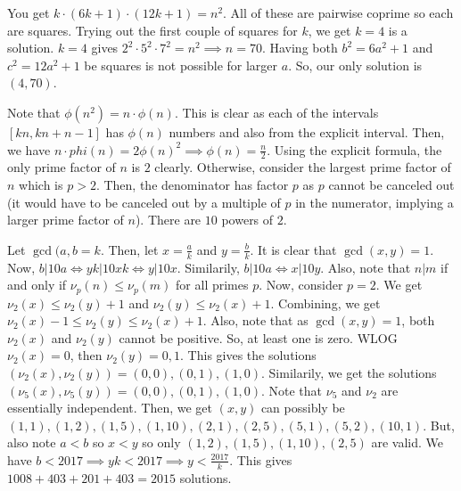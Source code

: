 \documentclass[11pt]{article}
\begin{document}
\begin{sol}
You get $k\cdot (6k+1)\cdot (12k+1)=n^2$. All of these are pairwise coprime so each are squares. Trying out the first couple of squares for $k$, we get $k=4$ is a solution. $k=4$ gives $2^2\cdot 5^2\cdot 7^2=n^2\implies n = 70$. Having both $b^2=6a^2+1$ and $c^2=12a^2+1$ be squares is not possible for larger $a$. So, our only solution is $\boxed{(4,70)}$.
\end{sol}
 

\begin{sol}
Note that $\phi(n^2)=n\cdot \phi(n)$. This is clear as each of the intervals $[kn,kn+n-1]$ has $\phi(n)$ numbers and also from the explicit interval. Then, we have $n\cdot phi(n)=2\phi(n)^2\implies \phi(n)=\frac{n}{2}$. Using the explicit formula, the only prime factor of $n$ is $2$ clearly. Otherwise, consider the largest prime factor of $n$ which is $p>2$. Then, the denominator has factor $p$ as $p$ cannot be canceled out (it would have to be canceled out by a multiple of $p$ in the numerator, implying a larger prime factor of $n$). There are $\boxed{10}$ powers of $2$.
\end{sol}


\begin{sol}
Let $\gcd(a,b=k$. Then, let $x=\frac{a}{k}$ and $y=\frac{b}{k}$. It is clear that $\gcd(x,y)=1$. Now, $b|10a\iff yk|10xk\iff y|10x$. Similarily, $b|10a\iff x|10y$. Also, note that $n|m$ if and only if $\nu_{p}(n)\leq \nu_{p}(m)$ for all primes $p$. Now, consider $p=2$. We get $\nu_{2}(x)\leq \nu_{2}(y)+1$ and $\nu_{2}(y)\leq \nu_{2}(x)+1$. Combining, we get $\nu_{2}(x)-1\leq \nu_{2}(y)\leq \nu_{2}(x)+1$. Also, note that as $\gcd(x,y)=1$, both $\nu_{2}(x)$ and $\nu_{2}(y)$ cannot be positive. So, at least one is zero. WLOG $\nu_{2}(x)=0$, then $\nu_{2}(y)=0,1$. This gives the solutions $(\nu_{2}(x),\nu_{2}(y))=(0,0),(0,1),(1,0)$. Similarily, we get the solutions $(\nu_{5}(x),\nu_{5}(y))=(0,0),(0,1),(1,0)$. Note that $\nu_{5}$ and $\nu_{2}$ are essentially independent. Then, we get $(x,y)$ can possibly be $(1,1),(1,2),(1,5),(1,10),(2,1),(2,5),(5,1),(5,2),(10,1)$. But, also note $a<b$ so $x<y$ so only $(1,2),(1,5),(1,10),(2,5)$ are valid. We have $b<2017\implies yk<2017\implies y < \frac{2017}{k}$. This gives $1008+403+201+403=\boxed{2015}$ solutions.
\end{sol}
\end{document}
